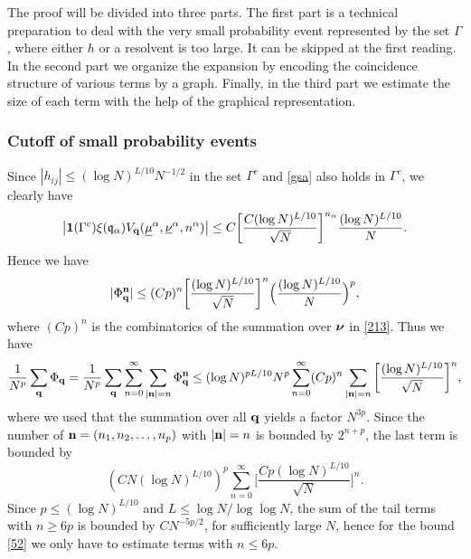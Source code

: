 \documentclass[draft]{article}
\newcommand{\unu}{{\underline {\nu}}}
\newcommand{\umu}{{\underline {\mu}}}
\newcommand{\bq}{{\bf {q}}}
\newcommand{\bn}{{\bf{n}}}
\newcommand{\fq}{{\frak q}}
\newcommand{\bnu}{\mbox{\boldmath $\nu$}}
\newcommand{\al}{\alpha}
\newcommand{\be}{\begin{equation}}
\newcommand{\ee}{\end{equation}}
\numberwithin{equation}{section}
\numberwithin{theorem}{section}
\numberwithin{definition}{section}
\numberwithin{remark}{section}
\begin{document}
The proof will be divided into three parts.
The first part is  a technical preparation to deal with the 
very small probability event represented by the
set $\Gamma$, where either $h$ or a resolvent
is too large. It can be skipped at the first reading.
In the second part we organize the expansion
by encoding the coincidence structure of various
terms by a graph. Finally, in the third part
we estimate the size of each term
with the help of the graphical representation.




\subsubsection{Cutoff of small probability events}


 

 Since 
$|h_{ij}|\le (\log N)^{L/10} N^{-1/2}$ in the set $\Gamma^c$
and  \eqref{gsa} also holds in $\Gamma^c$,
we clearly have 
\be\label{omxi}
\big|{\bf 1} (\Gamma^c)    \xi (\fq_\al)  
 V_\bq( \umu^\alpha, \unu^\alpha, n^\al) \big|\le 
C \bigg [ \frac {C (\log N)^{L/10}} { \sqrt N } \bigg]^{n_\alpha} \frac{(\log N)^{L/10} }{ N}. 
\ee
Hence we have 
\begin{align}
 |\Phi_{\bq}^{\bf n}| \le    
 (Cp)^n  \bigg [ \frac {(\log N)^{L/10} } { \sqrt N } \bigg]^{n}
\Big( \frac{(\log N)^{L/10} }{ N}\Big)^p,
\end{align}
where $(Cp)^n$ is the combinatorics of the summation 
over $\bnu$ in \eqref{213}. Thus we have 
\be\label{omm}
\frac{1}{N^p}  \sum_{\bq}   \Phi_{\bq}
= \frac{1}{N^p}  \sum_{\bq}    \sum_{n=0}^\infty \sum_{ |{\bf n} | =n}  \Phi_{\bq}^{\bf n} 
\le (\log N)^{pL/10} N^{p} \sum_{n=0}^\infty (Cp)^n\sum_{ |{\bf n} | =n}  
 \bigg [ \frac { (\log N)^{L/10} } { \sqrt N } \bigg]^{n},
\ee
where we used that the summation over all $\bq$ yields a factor $N^{3p}$.
Since the number of $\bn=(n_1, n_2, \ldots, n_p)$
 with $|\bn| = n$ is bounded by $2^{n+p}$,
  the last term is bounded by 
\be
(C N (\log N)^{L/10})^{p} \sum_{n=0}^\infty   
 \bigg [ \frac { Cp  (\log N)^{L/10} } { \sqrt N } \bigg]^{n}.
\ee
Since $p\le (\log N)^{L/10}$ and $L\le \log N/\log \log N$, 
the sum of the tail terms with $n \ge  6 p$
 is bounded by $CN^{-5p/2}$, for sufficiently large $N$,
hence for
the bound \eqref{52}
 we only have to estimate terms with $n \le 6 p$. 
\end{document}
